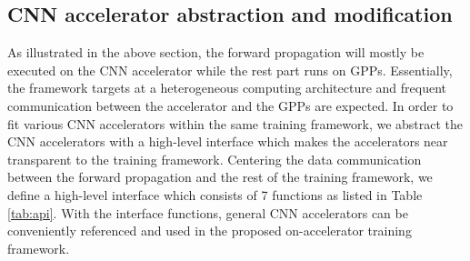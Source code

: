 \subsection{CNN accelerator abstraction and modification}
As illustrated in the above section, the forward propagation will 
mostly be executed on the CNN accelerator while 
the rest part runs on GPPs. Essentially, the framework targets at a 
heterogeneous computing architecture and frequent 
communication between the accelerator and the GPPs are expected. 
In order to fit various CNN accelerators within the same training framework,
we abstract the CNN accelerators with a high-level interface
which makes the accelerators near transparent to the training framework.
Centering the data communication between the forward propagation
and the rest of the training framework, we define a high-level
interface which consists of 7 functions as listed in Table \ref{tab:api}.
With the interface functions, general CNN accelerators can be conveniently
referenced and used in the proposed on-accelerator training framework.
